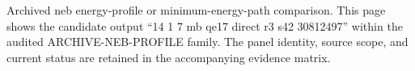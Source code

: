 Archived neb energy-profile or minimum-energy-path comparison. This page shows the candidate output ``14 1 7 mb qe17 direct r3 s42 30812497'' within the audited ARCHIVE-NEB-PROFILE family. The panel identity, source scope, and current status are retained in the accompanying evidence matrix.
